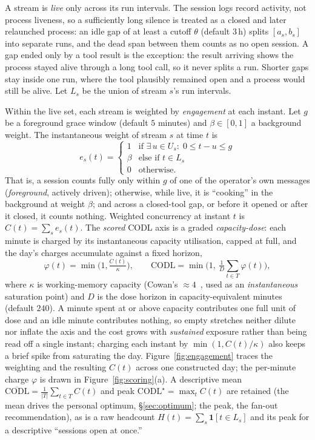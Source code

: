 \documentclass[10pt,twocolumn]{article}
\begin{document}
A stream is \emph{live} only across its run intervals. The session logs record
activity, not process liveness, so a sufficiently long silence is treated as a
closed and later relaunched process: an idle gap of
at least a cutoff $\theta$ (default $3$\,h) splits
$[a_s,b_s]$ into separate runs,
and the dead span between them counts as no open session. A gap ended only by a tool result is the exception: the
result arriving shows the process stayed alive through a long tool call, so it
never splits a run. Shorter gaps stay
inside one run, where the tool plausibly remained open and a process would still
be alive. Let $L_s$ be the union of stream $s$'s run intervals.

Within the live set, each stream is weighted by \emph{engagement} at each
instant. Let $g$ be a foreground grace window (default $5$ minutes) and
$\beta\in[0,1]$ a background weight. The instantaneous weight of stream $s$ at
time $t$ is
\begin{equation}
e_s(t) =
\begin{cases}
1 & \text{if } \exists\,u\in U_s:\; 0 \le t-u \le g \\[2pt]
\beta & \text{else if } t \in L_s \\[2pt]
0 & \text{otherwise.}
\end{cases}
\end{equation}
That is, a session counts fully only within $g$ of one of the operator's own
messages (\emph{foreground}, actively driven); otherwise, while live, it is
``cooking'' in the background at weight $\beta$; and across a closed-tool gap, or
before it opened or after it closed, it counts nothing. Weighted concurrency at
instant $t$ is $C(t)=\sum_{s} e_s(t)$. The \emph{scored} CODL axis is a graded
\emph{capacity-dose}: each minute is charged by its instantaneous capacity
utilisation, capped at full, and the day's charges accumulate against a fixed
horizon,
\begin{equation}
\varphi(t)=\min\!\Big(1,\tfrac{C(t)}{\kappa}\Big),\qquad
\mathrm{CODL}=\min\!\Big(1,\ \tfrac{1}{D}\sum_{t\in T}\varphi(t)\Big),
\end{equation}
where $\kappa$ is working-memory capacity (Cowan's $\approx 4$~\cite{cowan2001},
used as an \emph{instantaneous} saturation point) and $D$ is the dose horizon in
capacity-equivalent minutes (default $240$). A minute spent at or above capacity
contributes one full unit of dose and an idle minute contributes nothing, so
empty stretches neither dilute nor inflate the axis and the cost grows with
\emph{sustained} exposure rather than being read off a single instant; charging
each instant by $\min(1,C(t)/\kappa)$ also keeps a brief spike from saturating
the day. Figure~\ref{fig:engagement} traces the weighting and the resulting
$C(t)$ across one constructed day; the per-minute charge $\varphi$ is drawn in
Figure~\ref{fig:scoring}(a). A descriptive mean $\overline{\mathrm{CODL}}=\frac{1}{|T|}\sum_{t\in T}
C(t)$ and peak $\mathrm{CODL}^{\star}=\max_{t} C(t)$ are retained (the mean drives
the personal optimum, \S\ref{sec:optimum}; the peak, the fan-out recommendation),
as is a raw headcount $H(t)=\sum_s \mathbf{1}[t \in L_s]$ and its peak for a
descriptive ``sessions open at once.''
\end{document}
